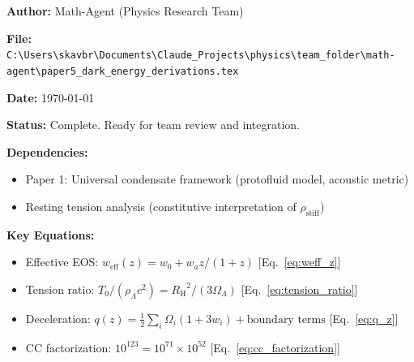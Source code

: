 \documentclass[11pt,a4paper]{article}
\newcommand{\rhostiff}{\ensuremath{\rho_{\mathrm{stiff}}}}
\newcommand{\Tzero}{\ensuremath{T_0}}
\newcommand{\RH}{\ensuremath{R_{\mathrm{H}}}}
\newcommand{\weff}{\ensuremath{w_{\mathrm{eff}}}}
\newcommand{\OmegaLam}{\ensuremath{\Omega_\Lambda}}
\theoremstyle{definition}
\theoremstyle{remark}
\begin{document}
\textbf{Author:} Math-Agent (Physics Research Team)

\textbf{File:} \texttt{C:\textbackslash Users\textbackslash skavbr\textbackslash Documents\textbackslash Claude\_Projects\textbackslash physics\textbackslash team\_folder\textbackslash math-agent\textbackslash paper5\_dark\_energy\_derivations.tex}

\textbf{Date:} \today

\textbf{Status:} Complete. Ready for team review and integration.

\textbf{Dependencies:}
\begin{itemize}
\item Paper 1: Universal condensate framework (protofluid model, acoustic metric)
\item Resting tension analysis (constitutive interpretation of $\rhostiff$)
\end{itemize}

\textbf{Key Equations:}
\begin{itemize}
\item Effective EOS: $\weff(z) = w_0 + w_a z/(1+z)$ [Eq.~\ref{eq:weff_z}]
\item Tension ratio: $\Tzero/(\rho_\Lambda c^2) = \RH^2/(3\OmegaLam)$ [Eq.~\ref{eq:tension_ratio}]
\item Deceleration: $q(z) = \frac{1}{2}\sum_i \Omega_i(1+3w_i) + \text{boundary terms}$ [Eq.~\ref{eq:q_z}]
\item CC factorization: $10^{123} = 10^{71} \times 10^{52}$ [Eq.~\ref{eq:cc_factorization}]
\end{itemize}
\end{document}
